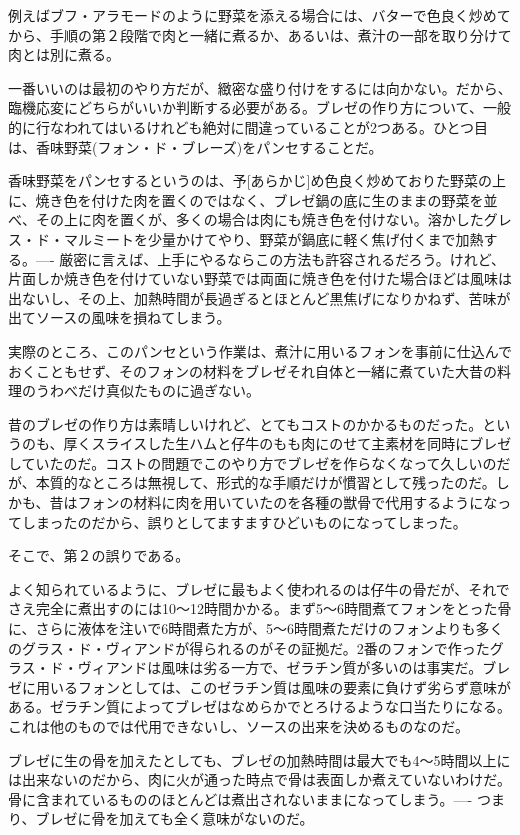 例えばブフ・アラモードのように野菜を添える場合には、バターで色良く炒めてから、手順の第２段階で肉と一緒に煮るか、あるいは、煮汁の一部を取り分けて肉とは別に煮る。

一番いいのは最初のやり方だが、緻密な盛り付けをするには向かない。だから、臨機応変にどちらがいいか判断する必要がある。ブレゼの作り方について、一般的に行なわれてはいるけれども絶対に間違っていることが2つある。ひとつ目は、香味野菜(フォン・ド・ブレーズ)をパンセすることだ。

香味野菜をパンセするというのは、予{[}あらかじ{]}め色良く炒めておりた野菜の上に、焼き色を付けた肉を置くのではなく、ブレゼ鍋の底に生のままの野菜を並べ、その上に肉を置くが、多くの場合は肉にも焼き色を付けない。溶かしたグレス・ド・マルミートを少量かけてやり、野菜が鍋底に軽く焦げ付くまで加熱する。----
厳密に言えば、上手にやるならこの方法も許容されるだろう。けれど、片面しか焼き色を付けていない野菜では両面に焼き色を付けた場合ほどは風味は出ないし、その上、加熱時間が長過ぎるとほとんど黒焦げになりかねず、苦味が出てソースの風味を損ねてしまう。

実際のところ、このパンセという作業は、煮汁に用いるフォンを事前に仕込んでおくこともせず、そのフォンの材料をブレゼそれ自体と一緒に煮ていた大昔の料理のうわべだけ真似たものに過ぎない。

昔のブレゼの作り方は素晴しいけれど、とてもコストのかかるものだった。というのも、厚くスライスした生ハムと仔牛のもも肉にのせて主素材を同時にブレゼしていたのだ。コストの問題でこのやり方でブレゼを作らなくなって久しいのだが、本質的なところは無視して、形式的な手順だけが慣習として残ったのだ。しかも、昔はフォンの材料に肉を用いていたのを各種の獣骨で代用するようになってしまったのだから、誤りとしてますますひどいものになってしまった。

そこで、第２の誤りである。

よく知られているように、ブレゼに最もよく使われるのは仔牛の骨だが、それでさえ完全に煮出すのには10〜12時間かかる。まず5〜6時間煮てフォンをとった骨に、さらに液体を注いで6時間煮た方が、5〜6時間煮ただけのフォンよりも多くのグラス・ド・ヴィアンドが得られるのがその証拠だ。2番のフォンで作ったグラス・ド・ヴィアンドは風味は劣る一方で、ゼラチン質が多いのは事実だ。ブレゼに用いるフォンとしては、このゼラチン質は風味の要素に負けず劣らず意味がある。ゼラチン質によってブレゼはなめらかでとろけるような口当たりになる。これは他のものでは代用できないし、ソースの出来を決めるものなのだ。

ブレゼに生の骨を加えたとしても、ブレゼの加熱時間は最大でも4〜5時間以上には出来ないのだから、肉に火が通った時点で骨は表面しか煮えていないわけだ。骨に含まれているもののほとんどは煮出されないままになってしまう。----
つまり、ブレゼに骨を加えても全く意味がないのだ。

